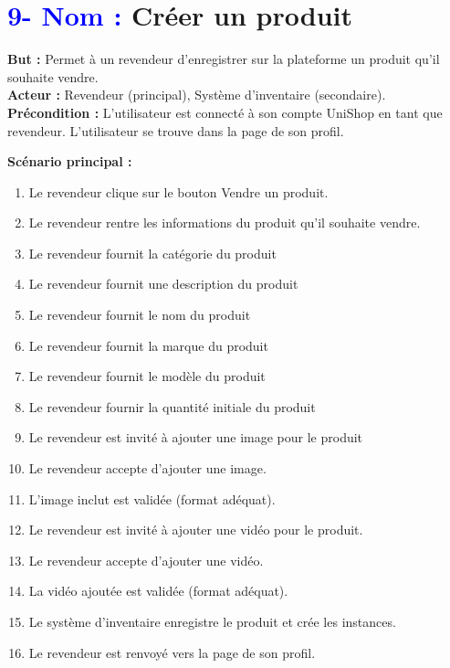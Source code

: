 \documentclass[16pt]{report}
\begin{document}
\section*{\textbf{\textcolor{blue}{9- Nom :}} Créer un produit}

\textbf{But :} Permet à un revendeur d’enregistrer sur la plateforme un produit qu’il souhaite vendre. \\
\textbf{Acteur :} Revendeur (principal), Système d’inventaire (secondaire). \\
\textbf{Précondition :} L’utilisateur est connecté à son compte UniShop en tant que revendeur. L’utilisateur se trouve dans la page de son profil.

\textbf{Scénario principal :}
\begin{enumerate}[leftmargin=4em]
    \item Le revendeur clique sur le bouton Vendre un produit.
    \item Le revendeur rentre les informations du produit qu’il souhaite vendre.
    \item Le revendeur fournit la catégorie du produit 
    \item Le revendeur fournit une description du produit
    \item Le revendeur fournit le nom du produit
    \item Le revendeur fournit la marque du produit
    \item Le revendeur fournit le modèle du produit
    \item Le revendeur fournir la quantité initiale du produit
    \item Le revendeur est invité à ajouter une image pour le produit
    \item Le revendeur accepte d’ajouter une image.
    \item L’image inclut est validée (format adéquat).
    \item Le revendeur est invité à ajouter une vidéo pour le produit.  
    \item Le revendeur accepte d’ajouter une vidéo. 
    \item La vidéo ajoutée est validée (format adéquat).
    \item Le système d’inventaire enregistre le produit et crée les instances. 
    \item Le revendeur est renvoyé vers la page de son profil.

\end{enumerate}
\end{document}

